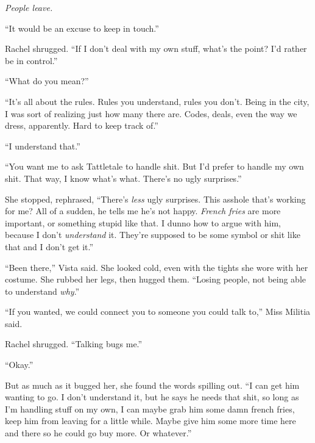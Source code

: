 \emph{People leave.}



``It would be an excuse to keep in touch.''



Rachel shrugged.  ``If I don't deal with my own stuff, what's the point?  I'd rather be in control.''



``What do you mean?''



``It's all about the rules.  Rules you understand, rules you don't.  Being in the city, I was sort of realizing just how many there are.  Codes, deals, even the way we dress, apparently.  Hard to keep track of.''



``I understand that.''



``You want me to ask Tattletale to handle shit.  But I'd prefer to handle my own shit.  That way, I know what's what.  There's no ugly surprises.''



She stopped, rephrased, ``There's \emph{less} ugly surprises.  This asshole that's working for me?  All of a sudden, he tells me he's not happy.  \emph{French fries} are more important, or something stupid like that.  I dunno how to argue with him, because I don't \emph{understand} it.  They're supposed to be some symbol or shit like that and I don't get it.''



``Been there,'' Vista said.  She looked cold, even with the tights she wore with her costume.  She rubbed her legs, then hugged them.  ``Losing people, not being able to understand \emph{why}.''



``If you wanted, we could connect you to someone you could talk to,'' Miss Militia said.



Rachel shrugged.  ``Talking bugs me.''



``Okay.''



But as much as it bugged her, she found the words spilling out.  ``I can get him wanting to go.  I don't understand it, but he says he needs that shit, so long as I'm handling stuff on my own, I can maybe grab him some damn french fries, keep him from leaving for a little while.  Maybe give him some more time here and there so he could go buy more.  Or whatever.''



